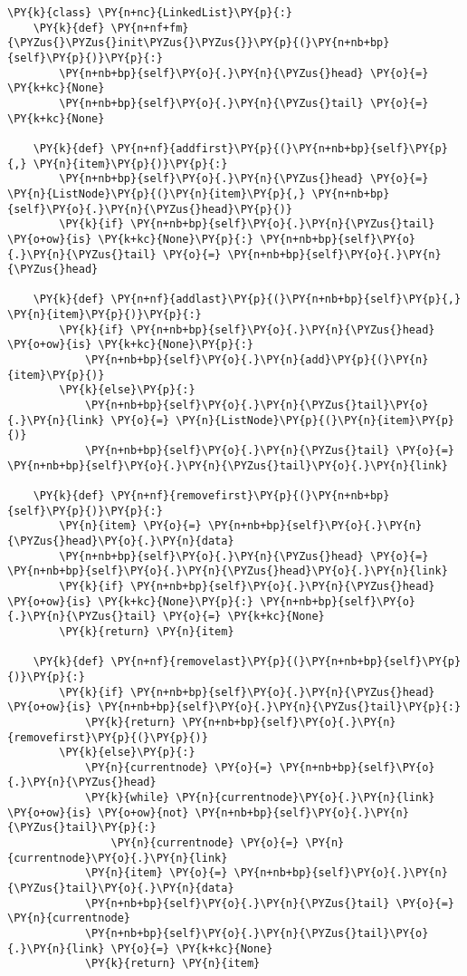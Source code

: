 \begin{Verbatim}[commandchars=\\\{\}]
\PY{k}{class} \PY{n+nc}{LinkedList}\PY{p}{:}
    \PY{k}{def} \PY{n+nf+fm}{\PYZus{}\PYZus{}init\PYZus{}\PYZus{}}\PY{p}{(}\PY{n+nb+bp}{self}\PY{p}{)}\PY{p}{:}
        \PY{n+nb+bp}{self}\PY{o}{.}\PY{n}{\PYZus{}head} \PY{o}{=} \PY{k+kc}{None}
        \PY{n+nb+bp}{self}\PY{o}{.}\PY{n}{\PYZus{}tail} \PY{o}{=} \PY{k+kc}{None}

    \PY{k}{def} \PY{n+nf}{addfirst}\PY{p}{(}\PY{n+nb+bp}{self}\PY{p}{,} \PY{n}{item}\PY{p}{)}\PY{p}{:}
        \PY{n+nb+bp}{self}\PY{o}{.}\PY{n}{\PYZus{}head} \PY{o}{=} \PY{n}{ListNode}\PY{p}{(}\PY{n}{item}\PY{p}{,} \PY{n+nb+bp}{self}\PY{o}{.}\PY{n}{\PYZus{}head}\PY{p}{)}
        \PY{k}{if} \PY{n+nb+bp}{self}\PY{o}{.}\PY{n}{\PYZus{}tail} \PY{o+ow}{is} \PY{k+kc}{None}\PY{p}{:} \PY{n+nb+bp}{self}\PY{o}{.}\PY{n}{\PYZus{}tail} \PY{o}{=} \PY{n+nb+bp}{self}\PY{o}{.}\PY{n}{\PYZus{}head}

    \PY{k}{def} \PY{n+nf}{addlast}\PY{p}{(}\PY{n+nb+bp}{self}\PY{p}{,} \PY{n}{item}\PY{p}{)}\PY{p}{:}
        \PY{k}{if} \PY{n+nb+bp}{self}\PY{o}{.}\PY{n}{\PYZus{}head} \PY{o+ow}{is} \PY{k+kc}{None}\PY{p}{:}
            \PY{n+nb+bp}{self}\PY{o}{.}\PY{n}{add}\PY{p}{(}\PY{n}{item}\PY{p}{)}
        \PY{k}{else}\PY{p}{:}
            \PY{n+nb+bp}{self}\PY{o}{.}\PY{n}{\PYZus{}tail}\PY{o}{.}\PY{n}{link} \PY{o}{=} \PY{n}{ListNode}\PY{p}{(}\PY{n}{item}\PY{p}{)}
            \PY{n+nb+bp}{self}\PY{o}{.}\PY{n}{\PYZus{}tail} \PY{o}{=} \PY{n+nb+bp}{self}\PY{o}{.}\PY{n}{\PYZus{}tail}\PY{o}{.}\PY{n}{link}

    \PY{k}{def} \PY{n+nf}{removefirst}\PY{p}{(}\PY{n+nb+bp}{self}\PY{p}{)}\PY{p}{:}
        \PY{n}{item} \PY{o}{=} \PY{n+nb+bp}{self}\PY{o}{.}\PY{n}{\PYZus{}head}\PY{o}{.}\PY{n}{data}
        \PY{n+nb+bp}{self}\PY{o}{.}\PY{n}{\PYZus{}head} \PY{o}{=} \PY{n+nb+bp}{self}\PY{o}{.}\PY{n}{\PYZus{}head}\PY{o}{.}\PY{n}{link}
        \PY{k}{if} \PY{n+nb+bp}{self}\PY{o}{.}\PY{n}{\PYZus{}head} \PY{o+ow}{is} \PY{k+kc}{None}\PY{p}{:} \PY{n+nb+bp}{self}\PY{o}{.}\PY{n}{\PYZus{}tail} \PY{o}{=} \PY{k+kc}{None}
        \PY{k}{return} \PY{n}{item}

    \PY{k}{def} \PY{n+nf}{removelast}\PY{p}{(}\PY{n+nb+bp}{self}\PY{p}{)}\PY{p}{:}
        \PY{k}{if} \PY{n+nb+bp}{self}\PY{o}{.}\PY{n}{\PYZus{}head} \PY{o+ow}{is} \PY{n+nb+bp}{self}\PY{o}{.}\PY{n}{\PYZus{}tail}\PY{p}{:}
            \PY{k}{return} \PY{n+nb+bp}{self}\PY{o}{.}\PY{n}{removefirst}\PY{p}{(}\PY{p}{)}
        \PY{k}{else}\PY{p}{:}
            \PY{n}{currentnode} \PY{o}{=} \PY{n+nb+bp}{self}\PY{o}{.}\PY{n}{\PYZus{}head}
            \PY{k}{while} \PY{n}{currentnode}\PY{o}{.}\PY{n}{link} \PY{o+ow}{is} \PY{o+ow}{not} \PY{n+nb+bp}{self}\PY{o}{.}\PY{n}{\PYZus{}tail}\PY{p}{:}
                \PY{n}{currentnode} \PY{o}{=} \PY{n}{currentnode}\PY{o}{.}\PY{n}{link}
            \PY{n}{item} \PY{o}{=} \PY{n+nb+bp}{self}\PY{o}{.}\PY{n}{\PYZus{}tail}\PY{o}{.}\PY{n}{data}
            \PY{n+nb+bp}{self}\PY{o}{.}\PY{n}{\PYZus{}tail} \PY{o}{=} \PY{n}{currentnode}
            \PY{n+nb+bp}{self}\PY{o}{.}\PY{n}{\PYZus{}tail}\PY{o}{.}\PY{n}{link} \PY{o}{=} \PY{k+kc}{None}
            \PY{k}{return} \PY{n}{item}
\end{Verbatim}



